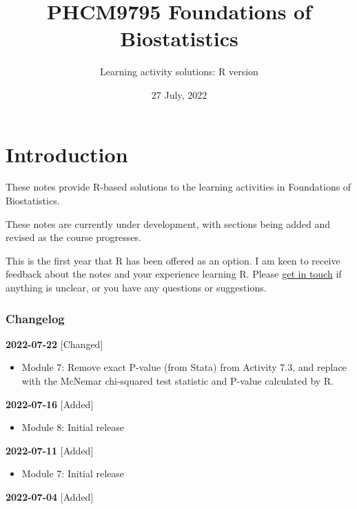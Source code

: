 \documentclass[
]{memoir}
\title{PHCM9795 Foundations of Biostatistics}
\author{Learning activity solutions: R version}
\date{27 July, 2022}
\providecommand{\tightlist}{%
  \setlength{\itemsep}{0pt}\setlength{\parskip}{0pt}}
\begin{document}
\maketitle

{
\setcounter{tocdepth}{1}
\tableofcontents
}
\hypertarget{introduction}{%
\chapter*{Introduction}\label{introduction}}

These notes provide R-based solutions to the learning activities in Foundations of Biostatistics.

These notes are currently under development, with sections being added and revised as the course progresses.

This is the first year that R has been offered as an option. I am keen to receive feedback about the notes and your experience learning R. Please \href{mailto:t.dobbins@unsw.edu.au}{get in touch} if anything is unclear, or you have any questions or suggestions.

\hypertarget{changelog}{%
\subsection*{Changelog}\label{changelog}}

\textbf{2022-07-22}
{[}Changed{]}

\begin{itemize}
\tightlist
\item
  Module 7: Remove exact P-value (from Stata) from Activity 7.3, and replace with the McNemar chi-squared test statistic and P-value calculated by R.
\end{itemize}

\textbf{2022-07-16}
{[}Added{]}

\begin{itemize}
\tightlist
\item
  Module 8: Initial release
\end{itemize}

\textbf{2022-07-11}
{[}Added{]}

\begin{itemize}
\tightlist
\item
  Module 7: Initial release
\end{itemize}

\textbf{2022-07-04}
{[}Added{]}
\end{document}

